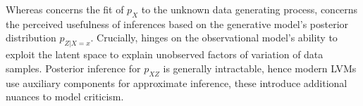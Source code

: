 Whereas \enumone concerns the fit of $p_X$ to the unknown data generating process, %
\enumtwo concerns the perceived usefulness of inferences based on the generative model's posterior distribution $p_{Z|X=x}$. Crucially, \enumtwo hinges on the observational model's ability to exploit the latent space to explain unobserved factors of variation of data samples.
Posterior inference for $p_{XZ}$ is generally intractable, hence modern LVMs use auxiliary components for approximate inference, these introduce additional nuances to model criticism.


